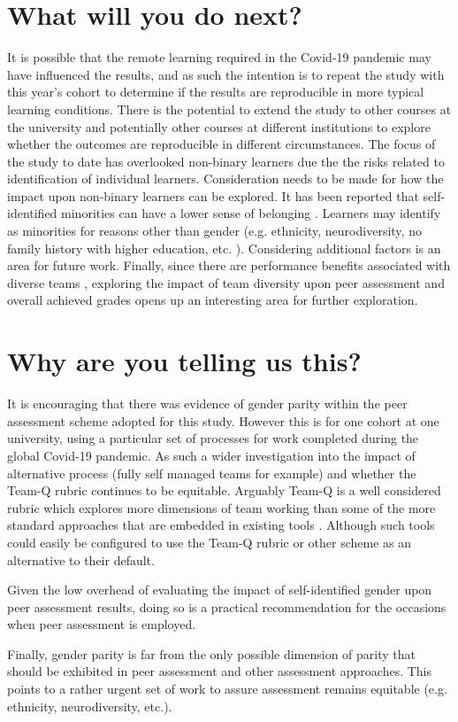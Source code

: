 \documentclass[sigconf, anonymous=true]{acmart}
\begin{document}
\section{What will you do next?}
 It is possible that the remote learning required in the Covid-19 pandemic may have influenced the results, and as such the intention is to repeat the study with this year's cohort to determine if the results are reproducible in more typical learning conditions. There is the potential to extend the study to other courses at the university and potentially other courses at different institutions to explore whether the outcomes are reproducible in different circumstances. The focus of the study to date has overlooked non-binary learners due the the risks related to identification of individual learners. Consideration needs to be made for how the impact upon non-binary learners can be explored. It has been reported that self-identified minorities can have a lower sense of belonging \cite{Mooney2020}. Learners may identify as minorities for reasons other than gender (e.g. ethnicity, neurodiversity, no family history with higher education, etc. ). Considering additional factors is an area for future work. Finally, since there are performance benefits associated with diverse teams \cite{HBR206}, exploring the impact of team diversity upon peer assessment and overall achieved grades opens up an interesting area for further exploration.


\section{Why are you telling us this?}
It is encouraging that there was evidence of gender parity within the peer assessment scheme adopted for this study. However this is for one cohort at one university, using a particular set of processes for work completed during the global Covid-19 pandemic. As such a wider investigation into the impact of alternative process (fully self managed teams for example) and whether the Team-Q rubric continues to be equitable. Arguably Team-Q is a well considered rubric which explores more dimensions of team working than some of the more standard approaches that are embedded in existing tools \cite{WebPA,BuddyCheck,SparkPlus}. Although such tools could easily be configured to use the Team-Q rubric or other scheme as an alternative to their default.

Given the low overhead of evaluating the impact of self-identified gender upon peer assessment results, doing so is a practical recommendation for the occasions when peer assessment is employed.

Finally, gender parity is far from the only possible dimension of parity that should be exhibited in peer assessment and other assessment approaches. This points to a rather urgent set of work to assure assessment remains equitable (e.g. ethnicity, neurodiversity, etc.). 


\end{document}
